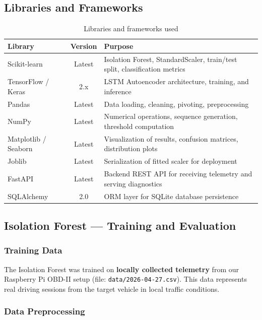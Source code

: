 \subsection{Libraries and Frameworks}

\begin{table}[h]
\centering
\begin{tabular}{|l|c|p{7cm}|}
\hline
\textbf{Library} & \textbf{Version} & \textbf{Purpose} \\
\hline
Scikit-learn & Latest & Isolation Forest, StandardScaler, train/test split, classification metrics \\
\hline
TensorFlow / Keras & 2.x & LSTM Autoencoder architecture, training, and inference \\
\hline
Pandas & Latest & Data loading, cleaning, pivoting, preprocessing \\
\hline
NumPy & Latest & Numerical operations, sequence generation, threshold computation \\
\hline
Matplotlib / Seaborn & Latest & Visualization of results, confusion matrices, distribution plots \\
\hline
Joblib & Latest & Serialization of fitted scaler for deployment \\
\hline
FastAPI & Latest & Backend REST API for receiving telemetry and serving diagnostics \\
\hline
SQLAlchemy & 2.0 & ORM layer for SQLite database persistence \\
\hline
\end{tabular}
\caption{Libraries and frameworks used}
\label{tab:libraries}
\end{table}

\subsection{Isolation Forest --- Training and Evaluation}

\subsubsection{Training Data}

The Isolation Forest was trained on \textbf{locally collected telemetry} from our Raspberry Pi OBD-II setup (file: \texttt{data/2026-04-27.csv}). This data represents real driving sessions from the target vehicle in local traffic conditions.

\subsubsection{Data Preprocessing}

